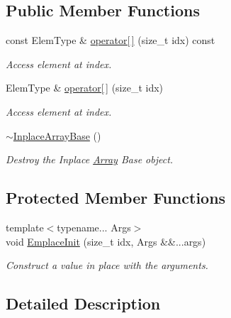 \subsection*{Public Member Functions}
\begin{DoxyCompactItemize}
\item 
const Elem\+Type \& \hyperlink{classtvm_1_1runtime_1_1InplaceArrayBase_a68c9bdbfd3a02ade0965972a0cd508cc}{operator\mbox{[}$\,$\mbox{]}} (size\+\_\+t idx) const 
\begin{DoxyCompactList}\small\item\em Access element at index. \end{DoxyCompactList}\item 
Elem\+Type \& \hyperlink{classtvm_1_1runtime_1_1InplaceArrayBase_a4b37b5fcd2285b818e8f623da8b326b2}{operator\mbox{[}$\,$\mbox{]}} (size\+\_\+t idx)
\begin{DoxyCompactList}\small\item\em Access element at index. \end{DoxyCompactList}\item 
\hyperlink{classtvm_1_1runtime_1_1InplaceArrayBase_ad1cf3446de62c7aba99235f2843f839f}{$\sim$\+Inplace\+Array\+Base} ()
\begin{DoxyCompactList}\small\item\em Destroy the Inplace \hyperlink{classtvm_1_1Array}{Array} Base object. \end{DoxyCompactList}\end{DoxyCompactItemize}
\subsection*{Protected Member Functions}
\begin{DoxyCompactItemize}
\item 
{\footnotesize template$<$typename... Args$>$ }\\void \hyperlink{classtvm_1_1runtime_1_1InplaceArrayBase_a7900079ae38be41d93b522239d3ba4f2}{Emplace\+Init} (size\+\_\+t idx, Args \&\&...args)
\begin{DoxyCompactList}\small\item\em Construct a value in place with the arguments. \end{DoxyCompactList}\end{DoxyCompactItemize}


\subsection{Detailed Description}
